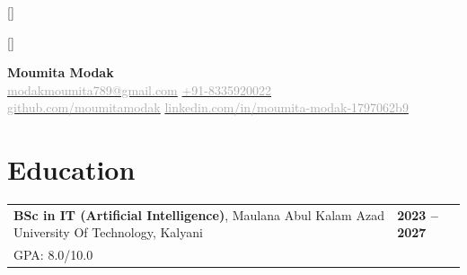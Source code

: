 \documentclass{article}
\begin{document}

\renewcommand{\familydefault}{\sfdefault}

\titleformat{\section}{\Large\bfseries\color{headerblue}}{}{0em}{}[\titlerule]
\titleformat{\subsection}{\large\bfseries\color{darkgray}}{}{0em}{}[\vspace{0.5em}\titlerule]

\pagestyle{fancy}
\fancyhf{}
\fancyhead[C]{\textcolor{headerblue}}

\fancyfoot[C]{\thepage}
\renewcommand{\footrulewidth}{0.4pt}
\renewcommand{\headrulewidth}{0.4pt}



\begin{center}
    {\Huge \textbf{\textcolor{headerblue}{Moumita Modak}}}\\
    \vspace{2mm}
    \href{mailto:modakmoumita789@@gmail.com}{\textcolor{darkgray}{\faEnvelope \hspace{1mm} modakmoumita789@gmail.com}} \quad
    \href{tel:+918335920022}{\textcolor{darkgray}{\faPhone \hspace{1mm} +91-8335920022}} \\
    \href{https://github.com/moumitamodak}{\textcolor{darkgray}{\faGithub \hspace{1mm} github.com/moumitamodak}} \quad
    \href{https://www.linkedin.com/in/moumita-modak-1797062b9}{\textcolor{darkgray}{\faLinkedin \hspace{1mm} linkedin.com/in/moumita-modak-1797062b9}} \quad
\end{center}

\vspace{5mm}

\section*{Education}
\begin{tabular}{p{} p{}}
    \textbf{BSc in IT (Artificial Intelligence)}, Maulana Abul Kalam Azad University Of Technology, Kalyani & \hfill \textbf{2023 -- 2027} \\
    GPA: 8.0/10.0 & \\
\end{tabular}
\end{document}

